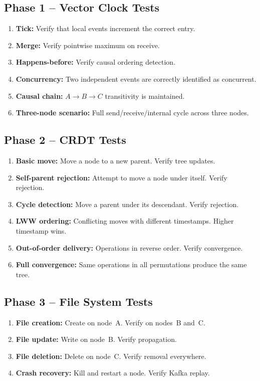 \documentclass[12pt, a4paper]{article}
\begin{document}
\subsection{Phase 1 -- Vector Clock Tests}

\begin{enumerate}
    \item \textbf{Tick:} Verify that local events increment the correct entry.
    \item \textbf{Merge:} Verify pointwise maximum on receive.
    \item \textbf{Happens-before:} Verify causal ordering detection.
    \item \textbf{Concurrency:} Two independent events are correctly identified as concurrent.
    \item \textbf{Causal chain:} $A \to B \to C$ transitivity is maintained.
    \item \textbf{Three-node scenario:} Full send/receive/internal cycle across three nodes.
\end{enumerate}

\subsection{Phase 2 -- CRDT Tests}

\begin{enumerate}
    \item \textbf{Basic move:} Move a node to a new parent. Verify tree updates.
    \item \textbf{Self-parent rejection:} Attempt to move a node under itself. Verify rejection.
    \item \textbf{Cycle detection:} Move a parent under its descendant. Verify rejection.
    \item \textbf{LWW ordering:} Conflicting moves with different timestamps. Higher timestamp wins.
    \item \textbf{Out-of-order delivery:} Operations in reverse order. Verify convergence.
    \item \textbf{Full convergence:} Same operations in all permutations produce the same tree.
\end{enumerate}

\subsection{Phase 3 -- File System Tests}

\begin{enumerate}
    \item \textbf{File creation:} Create on node~A. Verify on nodes~B and~C.
    \item \textbf{File update:} Write on node~B. Verify propagation.
    \item \textbf{File deletion:} Delete on node~C. Verify removal everywhere.
    \item \textbf{Crash recovery:} Kill and restart a node. Verify Kafka replay.
\end{enumerate}
\end{document}

